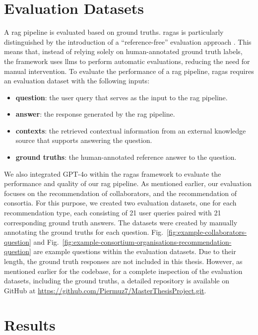 \section{Evaluation Datasets}\label{sec:evaluation-datasets}
A \gls{rag} pipeline is evaluated based on ground truths.
\gls{ragas} is particularly distinguished by the introduction of a ``reference-free'' evaluation approach \cite{ragas2024}.
This means that, instead of relying solely on human-annotated ground truth labels, the framework uses \glspl{llm} to perform automatic evaluations, reducing the need for manual intervention.
To evaluate the performance of a \gls{rag} pipeline, \gls{ragas} requires an evaluation dataset with the following inputs:
\begin{itemize}
    \item \textbf{question}: the user query that serves as the input to the \gls{rag} pipeline.
	\item \textbf{answer}: the response generated by the \gls{rag} pipeline.
	\item \textbf{contexts}: the retrieved contextual information from an external knowledge source that supports answering the question.
	\item \textbf{ground truths}: the human-annotated reference answer to the question.
\end{itemize}

We also integrated GPT-4o within the \gls{ragas} framework to evaluate the performance and quality of our \gls{rag} pipeline.
As mentioned earlier, our evaluation focuses on the recommendation of collaborators, and the recommendation of consortia.
For this purpose, we created two evaluation datasets, one for each recommendation type, each consisting of 21 user queries paired with 21 corresponding ground truth answers.
The datasets were created by manually annotating the ground truths for each question.
Fig.~\ref{fig:example-collaborators-question} and Fig.~\ref{fig:example-consortium-organisations-recommendation-question} are example questions within the evaluation datasets.
Due to their length, the ground truth responses are not included in this thesis.
However, as mentioned earlier for the codebase, for a complete inspection of the evaluation datasets, including the ground truths, a detailed repository is available on GitHub at \url{https://github.com/Piermuz7/MasterThesisProject.git}.

\section{Results}\label{sec:results}

